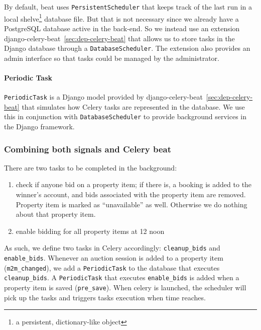 By default, beat uses \texttt{PersistentScheduler} that keeps track of the last
run in a local shelve\footnote{a persistent, dictionary-like object} database
file. But that is not necessary since we already have a PostgreSQL database
active in the back-end. So we instead use an extension
django-celery-beat~\ref{sec:dep-celery-beat} that allows us to store tasks in
the Django database through a \texttt{DatabaseScheduler}. The extension also
provides an admin interface so that tasks could be managed by the administrator.

\paragraph{Periodic Task}
\texttt{PeriodicTask} is a Django model provided by
django-celery-beat~\ref{sec:dep-celery-beat} that simulates how Celery tasks are
represented in the database. We use this in conjunction with
\texttt{DatabaseScheduler} to provide background services in the Django
framework.

\subsubsection{Combining both signals and Celery beat}
There are two tasks to be completed in the background:
\begin{enumerate}
  \item check if anyone bid on a property item; if there is, a booking is added
    to the winner's account, and bids associated with the property item are
    removed. Property item is marked as ``unavailable'' as well. Otherwise we do
    nothing about that property item.
  \item enable bidding for all property items at 12 noon
\end{enumerate}
As such, we define two tasks in Celery accordingly: \texttt{cleanup\_bids} and
\texttt{enable\_bids}. Whenever an auction session is added to a property item
(\texttt{m2m\_changed}), we add a \texttt{PeriodicTask} to the database that
executes \texttt{cleanup\_bids}. A \texttt{PeriodicTask} that executes
\texttt{enable\_bids} is added when a property item is
saved (\texttt{pre\_save}). When celery is launched, the scheduler will pick up
the tasks and triggers tasks execution when time reaches.

